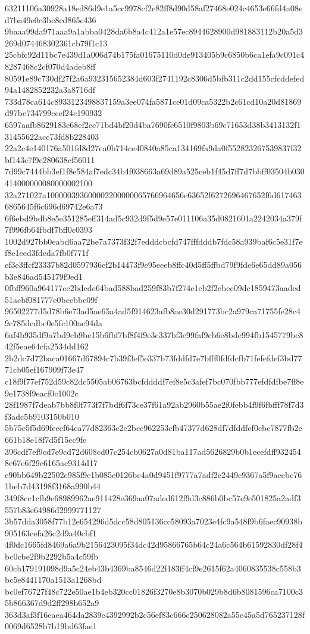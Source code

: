 {63211106a30928a18ed86d9e1a5cc9978cf2e82ff8d90d58af27468e024c4653e66fd4a08ed7ba49e0c3bc8cd865c436
9baaa99da971aaa9a1abba0428da6b8a4c412a1e57ec8944628900d981883112b20a5d3269d074468302361cb79f1c13
25cbfc92d11bc7e439d1a006d74b175fa01675110d0de913405b9c6850b6ca1efa9c091c48287468c2cf070d4adeb8ff
80591e89c730df27f2a6a932315652384d603f2741192c8306d5bfb311c2dd155cfcddefed94a1482852232a3a8716df
733d78ca614c8933123498837159a3ee074fa5871ce01d09ca5322b2c61cd10a20d81869d97be734799ccef24c190932
6597aafb8629183e68ef2ce71bd4bf20d4ba7690fe6510f9803b69c71653d38b3413132f131455622acc73fd8b228403
22a2c4e140176a501fd8d27ea0b714ce40840a85ca134169fa9da0f552823267539837f32bf143e7f9c280638cf56011
7d99c7444bb3ef1f8e584af7edc34b4f038663a69d89a525ceb1f45d7ff7d7bbff03504b030414000000080000002100
32a271027a100000393600002200000065766964656e63652f6272696467652f6d6174636865645f6c696d69742e6a73
6f6ebd9bdb8e5e351285eff314ad5c932d9f5d9e57e011106a35d0821601a2242034a379f7f996fb64fbdf7bff0c0393
1002d927bb0eabd6aa72be7a7373f32f7edddcbcfd747fffdddb7fdc58a939baf6c5e31f7ef8e1eed3fdeda7fb0f771f
ef3e3ffcf23337b82d0597936ef2b14473f9e95eeeb8ffc40d5ff5ffbd79f9fde6e65dd89a056b3e846ad545179f9ed1
0fbff960a964177ce2bdcdc64bad588bad259f83b7f274e1eb2f2ebec09dc1859473aaded51aebf081777e0bcebbc09f
96502277d5d78b6e73ad5ae65a4ad5f914623afb8ae30d291773bc2a979ca71755fe28c49c785dcdbe0e5fc100ae94da
6af4b935df9a7bd9cb9be15b6fbf7bf8f4f9e3c337bf3e99faf9cb6e8bde994fb1545779bc842f5eae64cfa2534dd162
2b2dc7d72baca01667d67894c7b39f3ef5e337b73fddfd7e7bfff0fdfdcfb71fefefdef3bd7771cb05ef167909f73e47
c18f9f77ef752d59c82dc5505ab06763bcfddddf7ef8e5c3afef7bc070fbb777efdfdfbe7ff8e9e1738f9eacf0c1002c
28f1987f7deab7bb8f0f773f7f7bdf6f73ce37f61a92ab2960b55ae2f0febb4f9f6fbfff78f7d3f3adc5b9103150b010
5b75e5f5d69feeef64ca77d82363c2e2bcc962253cfb47377d628df7dfddfef0cbc7877fb2e661b18e18f7d5f15cc9fe
396cdf7ef9cd7e9cd72d608cd07c254cb0627a0d81ba117ad5626829b0b1ecefdff9324548e67e6f29e6165ac9314d17
c90bb649b22502c985f9e1b085e0126bc4a0d9451f9777a7adf2e2449c9367a5f9acebc761beb7d43198f3168a990b44
349f8cc1cfb9e68989962ae911428e369aa07aded612f9d3c886b0bc57e9e501825a2adf3557b83e64986d2999771127
3b57dda3058f77b12e654296d5dcc58d805136cc58093a7023e4fc9a548f9b6faec90938b905163cefa26c2d9a40cbf1
4f0dc1665fd8469a6a9b2156423095f34dc42d95866765b64c24a6c564b61592830df28f4bc0cbe2f9b2292b5a4c59fb
60cb179191098d9a5c24eb43b4369ba8546d22f183ff4cf9e2615f62a4060835538c558b3bc5e8441170a1513a1268bd
bc0ef76727f48c722e50ae1b4eb320cc01826f3270e8b3070b029b8d6b8081596ca7100c35b866367d9d2ff298b652a9
363d3af3f16eaea464da2839c4392992b2c56ef83c666c250628082a55c45a5d765237128f0069d6528b7b19bd63fae1
}
